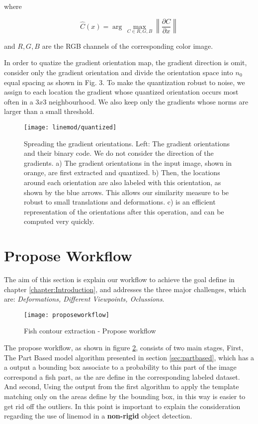 where

\begin{equation}
\hat{C}(x)=\arg \, \max\limits_{C \in {R,G,B}}\left\|\frac{\partial C}{\partial x}\right\|
\end{equation}

and $R,G,B$ are the RGB channels of the corresponding color image.

In order to quatize the gradient orientation map, the gradient direction is omit,
consider only the gradient orientation and divide the orientation space into $n_0$
equal spacing as shown in Fig. 3. To make the quantization robust to 
noise, we assign to each location the gradient whose quantized orientation occurs most often in a $3 x 3$
neighbourhood. We also keep only the gradients whose norms are larger than a small
threshold.

\begin{figure}[ht]
\centering
\texttt{[image: linemod/quantized]}
\caption{Spreading the gradient orientations. Left: The gradient orientations and their binary code. We do not consider the direction of the gradients. a) The gradient orientations in the input image, shown in orange, are first extracted and quantized. b) Then, the locations around each orientation are also labeled with this orientation, as shown by the blue
arrows. This allows our similarity measure to be robust to small translations and deformations. c) is an efficient representation of the orientations after this operation, and can be computed very quickly.}
\label{fig:clutter}
\end{figure}

\section{Propose Workflow}
\label{sec:proposeworkflow}
The aim of this section is explain our workflow to achieve the goal define in 
chapter \ref{chapter:Introduction}, and addresses the three major challenges, which are:
\textit{Deformations, Different Viewpoints, Oclussions}.

\begin{figure}[ht]
\begin{adjustwidth}{-1in}{-1in}
\centering
\texttt{[image: proposeworkflow]}
\caption{Fish contour extraction - Propose workflow}
\label{fig:Proposeworkflow}
\end{adjustwidth}
\end{figure}

The propose workflow, as shown in figure \ref{fig:Proposeworkflow}, consists of two
main stages, First, The Part Based model algorithm presented in section \ref{sec:partbased}, which 
has a a output a bounding box associate to a probability to this part of the image correspond a
fish part, as the are define in the corresponding labeled dataset. And second, Using the output
from the first algorithm to apply the template matching only on the areas define by the bounding box,
in this way is easier to get rid off the outliers. In this point is important to explain
the consideration regarding the use of linemod in a \textbf{non-rigid} object detection.

